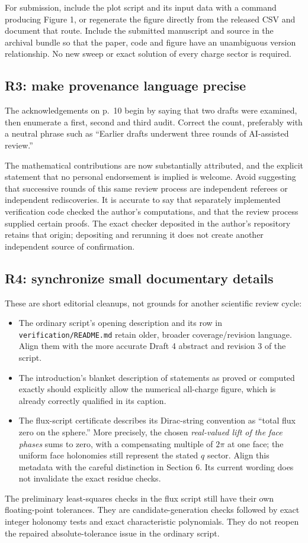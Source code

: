 \documentclass[11pt,a4paper]{article}
\begin{document}
For submission, include the plot script and its input data with a command producing Figure 1, or regenerate the figure directly from the released CSV and document that route. Include the submitted manuscript and source in the archival bundle so that the paper, code and figure have an unambiguous version relationship. No new sweep or exact solution of every charge sector is required.

\subsection{R3: make provenance language precise}
The acknowledgements on p.~10 begin by saying that two drafts were examined, then enumerate a first, second and third audit. Correct the count, preferably with a neutral phrase such as ``Earlier drafts underwent three rounds of AI-assisted review.''

The mathematical contributions are now substantially attributed, and the explicit statement that no personal endorsement is implied is welcome. Avoid suggesting that successive rounds of this same review process are independent referees or independent rediscoveries. It is accurate to say that separately implemented verification code checked the author's computations, and that the review process supplied certain proofs. The exact checker deposited in the author's repository retains that origin; depositing and rerunning it does not create another independent source of confirmation.

\subsection{R4: synchronize small documentary details}
These are short editorial cleanups, not grounds for another scientific review cycle:
\begin{itemize}
\item The ordinary script's opening description and its row in \texttt{verification/README.md} retain older, broader coverage/revision language. Align them with the more accurate Draft 4 abstract and revision 3 of the script.
\item The introduction's blanket description of statements as proved or computed exactly should explicitly allow the numerical all-charge figure, which is already correctly qualified in its caption.
\item The flux-script certificate describes its Dirac-string convention as ``total flux zero on the sphere.'' More precisely, the chosen \emph{real-valued lift of the face phases} sums to zero, with a compensating multiple of $2\pi$ at one face; the uniform face holonomies still represent the stated $q$ sector. Align this metadata with the careful distinction in Section 6. Its current wording does not invalidate the exact residue checks.
\end{itemize}
The preliminary least-squares checks in the flux script still have their own floating-point tolerances. They are candidate-generation checks followed by exact integer holonomy tests and exact characteristic polynomials. They do not reopen the repaired absolute-tolerance issue in the ordinary script.
\end{document}
